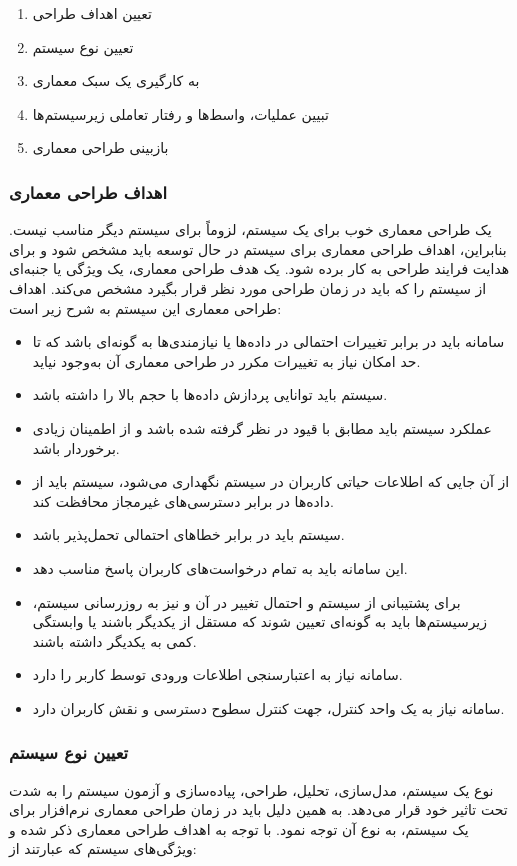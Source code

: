 \documentclass[12pt]{article}
\begin{document}
	\begin{enumerate}
		\renewcommand{\labelenumi}{گام \arabic{enumi}.}
		\item
		تعیین اهداف طراحی
		\item
		تعیین نوع سیستم
		\item
		به کارگیری یک سبک معماری
		\item
		تبیین عملیات، واسط‌ها و رفتار تعاملی زیرسیستم‌ها
		\item
		بازبینی طراحی معماری
	\end{enumerate}

	\subsubsection{اهداف طراحی معماری}
	یک طراحی معماری خوب برای یک سیستم، لزوماً برای سیستم دیگر مناسب نیست. بنابراین، اهداف طراحی معماری برای سیستم در حال توسعه باید مشخص شود و برای هدایت فرایند طراحی به کار برده شود. یک هدف طراحی معماری، یک ویژگی یا جنبه‌ای از سیستم را که باید در زمان طراحی مورد نظر قرار بگیرد مشخص می‌کند. اهداف طراحی معماری این سیستم به شرح زیر است:

	\begin{itemize}
		\item
		سامانه باید در برابر تغییرات احتمالی در داده‌ها یا نیازمندی‌ها به گونه‌ای باشد که تا حد امکان نیاز به تغییرات مکرر در طراحی معماری آن به‌وجود نیاید.
		\item
		سیستم باید توانایی پردازش داده‌ها با حجم بالا را داشته باشد.
		\item
		عملکرد سیستم باید مطابق با قیود در نظر گرفته شده باشد و از اطمینان زیادی برخوردار باشد.
		\item
		از آن جایی که اطلاعات حیاتی کاربران در سیستم نگهداری می‌شود، سیستم باید از داده‌ها در برابر دسترسی‌های غیرمجاز محافظت کند.
		\item
		سیستم باید در برابر خطاهای احتمالی تحمل‌پذیر باشد.
		\item
		این سامانه باید به تمام درخواست‌های کاربران پاسخ مناسب دهد.
		\item
		برای پشتیبانی از سیستم و احتمال تغییر در آن و نیز به روزرسانی سیستم، زیرسیستم‌ها باید به گونه‌ای تعیین شوند که مستقل از یکدیگر باشند یا وابستگی کمی به یکدیگر داشته باشند.
		\item
		سامانه نیاز به اعتبارسنجی اطلاعات ورودی توسط کاربر را دارد.
		\item
		سامانه نیاز به یک واحد کنترل، جهت کنترل سطوح دسترسی و نقش کاربران دارد.
	\end{itemize}

	\subsubsection{تعیین نوع سیستم}
	نوع یک سیستم، مدل‌سازی، تحلیل، طراحی، پیاده‌سازی و آزمون سیستم را به شدت تحت تاثیر خود قرار می‌دهد. به همین دلیل باید در زمان طراحی معماری نرم‌افزار برای یک سیستم، به نوع آن توجه نمود.
	با توجه به اهداف طراحی معماری ذکر شده و ویژگی‌های سیستم که عبارتند از:
\end{document}
